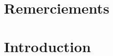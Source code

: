 \documentclass[a4paper,twoside,10pt,final]{memoir} %
\begin{document}



\frontmatter

%
%

\clearemptydoublepage


\clearemptydoublepage
%
\chapter*{Remerciements}

\clearemptydoublepage

\thispagestyle{empty}
\tableofcontents*
\clearemptydoublepage

\printunsrtglossary[title={Acronyms}]


\clearemptydoublepage
%


\mainmatter

\allowdisplaybreaks



\renewcommand{\thefigure}{\arabic{figure}} 
\chapter*[Introduction]{Introduction}
\thispagestyle{empty}

\clearpage
\renewcommand{\thefigure}{\thechapter.\arabic{figure}}
\end{document}
